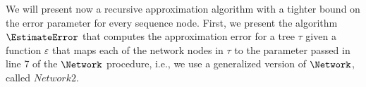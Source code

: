 \documentclass{article}
\begin{document}

We will present now a recursive approximation algorithm with a tighter bound on the error parameter for every sequence node. 
First, we present the algorithm $\EstimateError$ that computes the approximation error for a tree $\tau$ given a function $\varepsilon$ that maps each of the network nodes in $\tau$ to the parameter passed in line 7 of the $\Network$ procedure, i.e., we use a generalized version of $\Network$, called $Network2$. 
\end{document}
